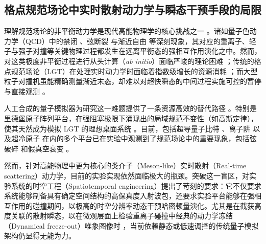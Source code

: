 \documentclass[../main.tex]{subfiles}
\begin{document}
\subsection{格点规范场论中实时散射动力学与瞬态干预手段的局限}
\label{ch1:subsec:problem_lgt}

理解规范场论的非平衡动力学是现代高能物理学的核心挑战之一 \cite{Calzetta_Hu_2008,gross_50_2023}。诸如量子色动力学（QCD）中的禁闭 \cite{wilson_confinement_1974}、弦断裂 \cite{bali_observation_2005} 与渐近自由 \cite{Frank_Nobel_2005} 等深刻现象，其对应的重离子、轻子与强子对撞等关键物理过程都发生在远离平衡态的强相互作用演化之中。然而，对这类极度非平衡过程进行从头计算（\textit{ab initio}）面临严峻的理论困难 \cite{wiese_ultracold_2013}；传统的格点规范场论（LGT）在处理实时动力学时面临着指数级增长的资源消耗 \cite{troyer_computational_2005,CarmenBanuls_Review_2020}；而大型粒子对撞机虽能精确测量渐近末态，却难以对超快瞬态的中间过程实施可控的暂停与直接观测 \cite{belyansky_high-energy_2024}。

人工合成的量子模拟器为研究这一难题提供了一条资源高效的替代路径 \cite{jordan_quantum_2012,zohar_quantum_2016,Banuls2020,Karpov_Spatiotemporal_2022,bauer_quantum_2023,bauer_quantum_2023-1,di_meglio_quantum_2024,su_cold-atom_2024,cheng_emergent_2024,halimeh_cold-atom_2025,farrell_digital_2025,Chai2025fermionic,chai2025resource,chai2025scalable}。特别是里德堡原子阵列平台，在强阻塞极限下涌现出的局域规范不变性（如高斯定律），使其天然成为模拟 LGT 的理想桌面系统 \cite{surace_lattice_2020,bernien2017probing,datla_statistical_2025}。目前，包括超导量子比特 \cite{wang_observation_2022,Cochran2025,mildenberger_confinement_2025,cobos2025realtimedynamics21dgauge}、离子阱 \cite{martinez_real-time_2016,kokail_self-verifying_2019,tan_observation_2021,meth_simulating_2025,mueller_quantum_2025} 以及超冷原子 \cite{schweizer_floquet_2019,gorg_realization_2019,yang_observation_2020,mil_scalable_2020,frolian_realizing_2022,zhou_thermalization_2022,wang_interrelated_2023,zhang_observation_2025} 在内的多个平台已在实验中观测到了规范场论中的重要现象，包括弦破碎 \cite{de_observation_2024,liu_string_2024,gonzalez-cuadra_observation_2025,Cochran2025} 和假真空衰变 \cite{zenesini_false_2024,zhu_probing_2024,vodeb_stirring_2025}。

然而，针对高能物理中更为核心的类介子（Meson-like）实时散射（Real-time scattering）动力学，目前的实验实现依然面临极大的瓶颈。突破这一盲区，对实验系统的时空工程（Spatiotemporal engineering）提出了苛刻的要求：它不仅要求系统能够制备具有确定空间结构的高保真度入射波包，还要求实验平台能够在强相互作用的碰撞期间，以极高的时空分辨率动态干预哈密顿量演化。尤其是在截获高度关联的散射瞬态，以在微观层面上检验重离子碰撞中经典的动力学冻结（Dynamical freeze-out）唯象图像时 \cite{Berges_QCD_2021,borsanyi2013freeze,Heinz:2007in,PhysRevLett.109.192302}，当前依赖静态或低速调控的传统量子模拟架构仍显得无能为力。
\end{document}
